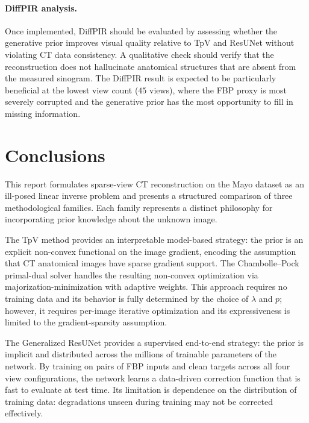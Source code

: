 \documentclass[11pt,a4paper]{article}
\begin{document}
\paragraph{DiffPIR analysis.}
Once implemented, DiffPIR should be evaluated by assessing whether the
generative prior improves visual quality relative to TpV and ResUNet without
violating CT data consistency. A qualitative check should verify that the
reconstruction does not hallucinate anatomical structures that are absent from
the measured sinogram. The DiffPIR result is expected to be particularly
beneficial at the lowest view count ($45$ views), where the FBP proxy is most
severely corrupted and the generative prior has the most opportunity to fill in
missing information.

\section{Conclusions}

This report formulates sparse-view CT reconstruction on the Mayo dataset as an
ill-posed linear inverse problem and presents a structured comparison of three
methodological families. Each family represents a distinct philosophy for
incorporating prior knowledge about the unknown image.

The TpV method provides an interpretable model-based strategy: the prior is an
explicit non-convex functional on the image gradient, encoding the assumption
that CT anatomical images have sparse gradient support. The Chambolle--Pock
primal-dual solver handles the resulting non-convex optimization via
majorization-minimization with adaptive weights. This approach requires no
training data and its behavior is fully determined by the choice of $\lambda$
and $p$; however, it requires per-image iterative optimization and its
expressiveness is limited to the gradient-sparsity assumption.

The Generalized ResUNet provides a supervised end-to-end strategy: the prior is
implicit and distributed across the millions of trainable parameters of the
network. By training on pairs of FBP inputs and clean targets across all four
view configurations, the network learns a data-driven correction function that
is fast to evaluate at test time. Its limitation is dependence on the
distribution of training data: degradations unseen during training may not be
corrected effectively.
\end{document}
